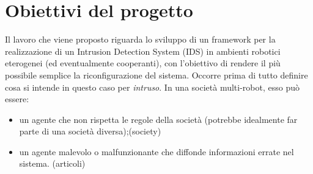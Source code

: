 \documentclass[paper=a4, fontsize=11pt]{scrartcl} %
\numberwithin{equation}{section} %
\numberwithin{figure}{section} %
\numberwithin{table}{section} %
\begin{document}
\section{Obiettivi del progetto}
Il lavoro che viene proposto riguarda lo sviluppo di un framework per la realizzazione di un Intrusion Detection System (IDS) in ambienti robotici eterogenei (ed eventualmente cooperanti), con l'obiettivo di rendere il più possibile
semplice la riconfigurazione del sistema. Occorre prima di tutto
definire cosa si intende in questo caso per \textit{intruso}. In una società multi-robot, esso può essere:
\begin{itemize}
\item un agente che non rispetta le regole della società (potrebbe idealmente far parte di una società diversa);(society)
\item un agente malevolo o malfunzionante che diffonde informazioni
errate nel sistema. (articoli) 
\end{itemize}
\end{document}
